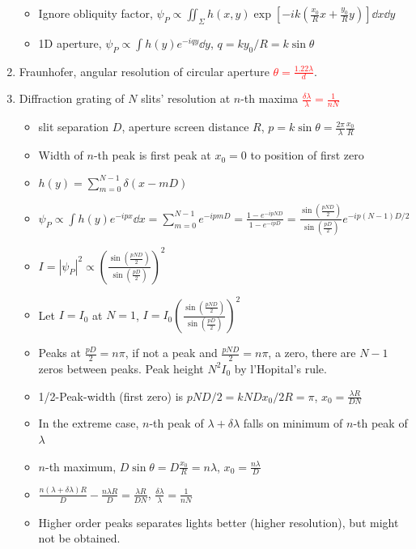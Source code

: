 \documentclass{article}
\theoremstyle{remark}
\theoremstyle{remark}
\begin{document}
\begin{enumerate}
\begin{itemize}
            \item Ignore obliquity factor, $\psi_P\propto\iint_\Sigma h(x,y)\exp\left[-ik\left(\frac{x_0}{R}x+\frac{y_0}{R}y\right)\right]\dd x\dd y$
            \item 1D aperture, $\psi_P\propto\int \boxed{h(y)e^{-iqy}\dd y}$, $q=ky_0/R=k\sin\theta$
        \end{itemize}
    \item Fraunhofer, angular resolution of circular aperture \textcolor{red}{$\theta=\frac{1.22\lambda}{d}$}.
    \item Diffraction grating of $N$ slits' resolution at $n$-th maxima \textcolor{red}{$\frac{\delta\lambda}{\lambda}=\frac{1}{nN}$}\begin{itemize}
        \item slit separation $D$, aperture screen distance $R$, $p=k\sin\theta=\frac{2\pi}{\lambda}\frac{x_0}{R}$
        \item Width of $n$-th peak is first peak at $x_0=0$ to position of first zero
        \item $h(y)=\sum_{m=0}^{N-1}\delta(x-mD)$
        \item $\psi_P\propto\int h(y)e^{-ipx}\dd x=\sum_{m=0}^{N-1}e^{-ipmD}=\frac{1-e^{-ipND}}{1-e^{-ipD}}=\frac{\sin(\frac{pND}{2})}{\sin(\frac{pD}{2})}e^{-ip(N-1)D/2}$
        \item $I=|\psi_P|^2\propto\left(\frac{\sin(\frac{pND}{2})}{\sin(\frac{pD}{2})}\right)^2$
        \item Let $I=I_0$ at $N=1$, $I=I_0\left(\frac{\sin(\frac{pND}{2})}{\sin(\frac{pD}{2})}\right)^2$
        \item Peaks at $\frac{pD}{2}=n\pi$, if not a peak and $\frac{pND}{2}=n\pi$, a zero, there are $N-1$ zeros between peaks. Peak height $N^2I_0$ by l'Hopital's rule.
        \item 1/2-Peak-width (first zero) is $pND/2=kNDx_0/2R=\pi$, $x_0=\frac{\lambda R}{DN}$
        \item In the extreme case, $n$-th peak of $\lambda+\delta\lambda$ falls on minimum of $n$-th peak of $\lambda$
        \item $n$-th maximum, $D\sin\theta=D\frac{x_0}{R}=n\lambda$, $x_0=\frac{n\lambda}{D}$
        \item $\frac{n(\lambda+\delta\lambda)R}{D}-\frac{n\lambda R}{D}=\frac{\lambda R}{DN}$, $\boxed{\frac{\delta\lambda}{\lambda}=\frac{1}{nN}}$
        \item Higher order peaks separates lights better (higher resolution), but might not be obtained.

\end{itemize}
\end{enumerate}
\end{document}
